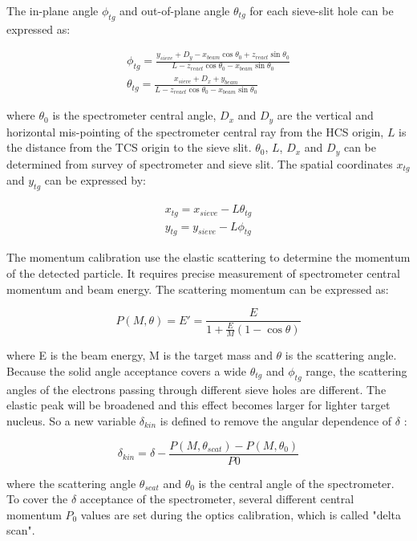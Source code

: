 The in-plane angle $\phi_{tg}$ and out-of-plane angle $\theta_{tg}$ for each sieve-slit hole can be
expressed as:

\begin{align}
\phi_{tg}   =
\frac{y_{sieve}+D_y-x_{beam}\cos\theta_0+z_{react}\sin\theta_0}{L-z_{react}\cos\theta_0-x_{beam}\sin\theta_0}\\
\theta_{tg} = \frac{x_{sieve}+D_x+y_{beam}}{L-z_{react}\cos\theta_0-x_{beam}\sin\theta_0}
\end{align}

where $\theta_0$ is the spectrometer central angle, $D_x$ and $D_y$ are the vertical and horizontal
mis-pointing of the spectrometer central ray from the HCS origin, $L$ is the distance from the
TCS origin to the sieve slit. $\theta_0$, $L$, $D_x$ and $D_y$ can be determined from survey
of spectrometer and sieve slit. The spatial coordinates $x_{tg}$ and $y_{tg}$ can be expressed by:

\begin{align}
x_{tg} = x_{sieve} - L \theta_{tg} \\
y_{tg} = y_{sieve} - L \phi_{tg} 
\end{align}

The momentum calibration use the elastic scattering to determine the momentum of the detected
particle. It requires precise measurement of spectrometer central momentum and beam energy.
The scattering momentum can be expressed as:

\begin{equation}
P(M,\theta) = E' = \frac{E}{1+\frac{E}{M}(1-\cos\theta)}
\end{equation}

where E is the beam energy, M is the target mass and $\theta$ is the scattering angle.
Because the solid angle acceptance covers a wide $\theta_{tg}$ and $\phi_{tg}$ range,
the scattering angles of the electrons passing through different sieve holes are different.
The elastic peak will be broadened and this effect becomes larger for lighter target nucleus.
So a new variable $\delta_{kin}$ is defined to remove the angular dependence of $\delta$ :

\begin{equation}
\delta_{kin} = \delta - \frac{P(M,\theta_{scat})-P(M,\theta_0)}{P0}
\end{equation}

where the scattering angle $\theta_{scat}$ and $\theta_0$ is the central angle of the spectrometer. 
To cover the $\delta$ acceptance of the spectrometer, several different central momentum $P_0$ values
are set during the optics calibration, which is called "delta scan".

